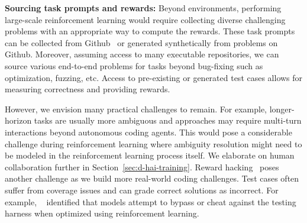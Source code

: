 \textbf{Sourcing task prompts and rewards:}
Beyond environments, performing large-scale reinforcement learning would require collecting diverse challenging problems with an appropriate way to compute the rewards. 
These task prompts can be collected from Github~\citep{pan2024trainingsoftwareengineeringagents} or generated synthetically from problems on Github.
Moreover, assuming access to many executable repositories, we can source various end-to-end problems for tasks beyond bug-fixing such as optimization, fuzzing, etc.
Access to pre-existing or generated test cases allows for measuring correctness and providing rewards. 


However, we envision many practical challenges to remain. 
For example, longer-horizon tasks are usually more ambiguous and approaches may require multi-turn interactions beyond autonomous coding agents.
This would pose a considerable challenge during reinforcement learning where ambiguity resolution might need to be modeled in the reinforcement learning process itself. 
We elaborate on human collaboration further in Section~\ref{sec:d-hai-training}.
Reward hacking~\cite{skalse2022defining} poses another challenge as we build more real-world coding challenges. 
Test cases often suffer from coverage issues and can grade correct solutions as incorrect.
For example, ~\cite{baker2025monitoring,denison2024sycophancy} identified that models attempt to bypass or cheat against the testing harness when optimized using reinforcement learning. 







